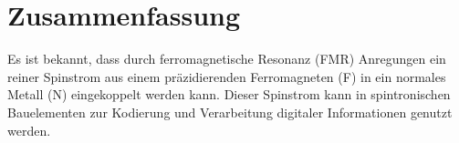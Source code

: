 



\chapter*{Zusammenfassung}
Es ist bekannt, dass durch ferromagnetische Resonanz (FMR) Anregungen ein reiner Spinstrom aus einem präzidierenden Ferromagneten (F) in ein normales Metall (N) eingekoppelt werden kann. Dieser Spinstrom kann in spintronischen Bauelementen zur Kodierung und Verarbeitung digitaler Informationen genutzt werden.

